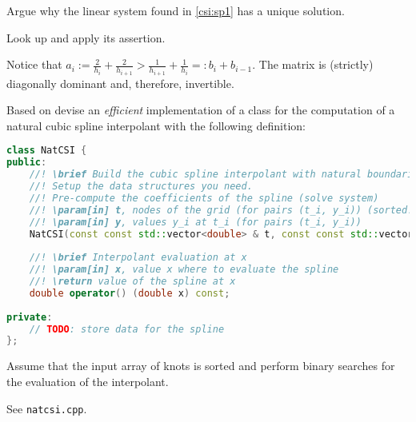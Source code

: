 \begin{problem}
  \begin{subproblem}[3]
    \label{csi:sp2}
    Argue why the linear system found in \autoref{csi:sp1} has a unique solution.
    
    \begin{hint}
    Look up  and apply its assertion.
    \end{hint}
    
  \begin{solution}
    Notice that $a_i := \frac{2}{h_i} + \frac{2}{h_{i+1}} > \frac{1}{h_{i+1}} + \frac{1}{h_{i}} =: b_i + b_{i-1}$. The matrix is (strictly) diagonally dominant and, therefore, invertible.
  \end{solution}
  \end{subproblem}

  \begin{subproblem}[3]
  Based on \Eigen{} devise an \emph{efficient} implementation of a \Cpp{} class for the 
  computation of a natural cubic spline interpolant with the following definition:
  \begin{lstlisting}[language=c++]
class NatCSI {
public:
    //! \brief Build the cubic spline interpolant with natural boundaries
    //! Setup the data structures you need.
    //! Pre-compute the coefficients of the spline (solve system)
    //! \param[in] t, nodes of the grid (for pairs (t_i, y_i)) (sorted!)
    //! \param[in] y, values y_i at t_i (for pairs (t_i, y_i))
    NatCSI(const const std::vector<double> & t, const const std::vector<double> & y);
    
    //! \brief Interpolant evaluation at x
    //! \param[in] x, value x where to evaluate the spline
    //! \return value of the spline at x
    double operator() (double x) const;
    
private:
    // TODO: store data for the spline
};
\end{lstlisting}
\begin{hint}
Assume that the input array of knots is sorted 
and perform binary searches for the evaluation of the interpolant.
\end{hint}
\end{subproblem}

\cprotEnv \begin{solution}
 See \verb|natcsi.cpp|.
\end{solution}
\end{problem}




